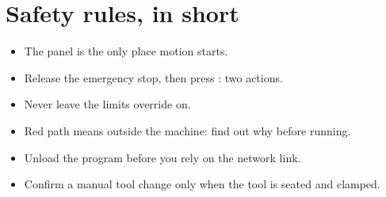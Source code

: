\section{Safety rules, in short}

\begin{safetybox}
  \begin{itemize}
    \item The panel is the only place motion starts.
    \item Release the emergency stop, then press : two actions.
    \item Never leave the limits override on.
    \item Red path means outside the machine: find out why before running.
    \item Unload the program before you rely on the network link.
    \item Confirm a manual tool change only when the tool is seated and clamped.
  \end{itemize}
\end{safetybox}
